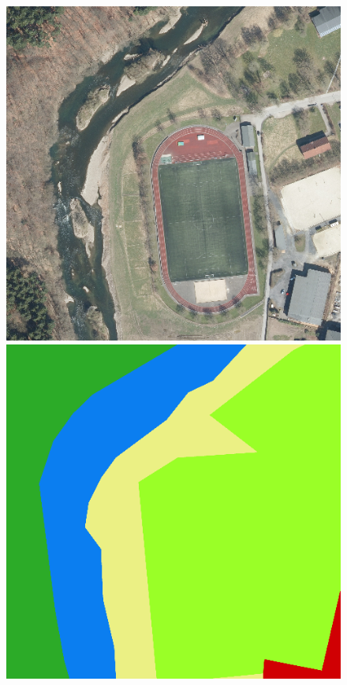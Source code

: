 {\begin{figure}
    \vspace{2mm}
    \includegraphics[width=\DiscussionImageWidth]{images/segmentation_discussion/images/3434.png} \hfill
    \includegraphics[width=\DiscussionImageWidth]{images/segmentation_discussion/labels/3434.png} \hfill

\end{figure}}
